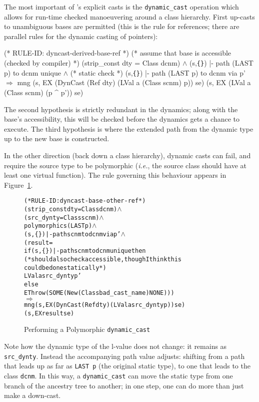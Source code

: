 \documentclass[11pt]{article}
\newcommand{\ie}{\emph{i.e.}}
\newcommand{\lbr}{\texttt{\{}}
\newcommand{\rbr}{\texttt{\}}}
\begin{document}
The most important of \cpp{}'s explicit casts is the
\texttt{dynamic_cast} operation which allows for run-time checked
manoeuvering around a class hierarchy.  First up-casts to unambiguous bases
are permitted (this is the rule for references; there are parallel
rules for the dynamic casting of pointers):%
%
%
\begin{stdrule}
(* RULE-ID: dyncast-derived-base-ref *)
(* assume that base is accessible (checked by compiler) *)
     (strip_const dty = Class dcnm) \(\land\)
     (s,\lbr\rbr) |- path (LAST p) to dcnm unique \(\land\) (* static check *)
     (s,\lbr\rbr) |- path (LAST p) to dcnm via p'
   \(\Rightarrow\)
     mng (s, EX (DynCast (Ref dty) (LVal a (Class scnm) p)) se)
         (s, EX (LVal a (Class scnm) (p ^ p')) se)
\end{stdrule}
The second hypothesis is strictly redundant in the dynamics; along with
the base's accessibility, this will be checked before the dynamics
gets a chance to execute.  The third hypothesis is where the extended
path from the dynamic type up to the new base is constructed.

In the other direction (back down a class hierarchy), dynamic casts
can fail, and require the source type to be polymorphic (\ie, the
source class should have at least one virtual function).  The rule
governing this behaviour appears in
Figure~\ref{fig:dyncast-base-other-ref}.
\begin{figure}[htbp]
\begin{center}
\begin{minipage}{\textwidth}
%
\begin{alltt}
(* RULE-ID: dyncast-base-other-ref *)
     (strip_const dty = Class dcnm) \(\land\)
     (src_dynty = Class scnm) \(\land\)
     polymorphic s (LAST p) \(\land\)
     (s,\lbr\rbr) |- path scnm to dcnm via p' \(\land\)
     (result =
      if (s,\lbr\rbr) |- path scnm to dcnm unique then
        (* should also check accessible, though I think this
           could be done statically *)
        LVal a src_dynty p'
      else
        EThrow (SOME (New (Class bad_cast_name) NONE)))
   \(\Rightarrow\)
     mng (s, EX (DynCast (Ref dty) (LVal a src_dynty p)) se)
         (s, EX result se)
\end{alltt}
\end{minipage}
\end{center}
\caption{Performing a Polymorphic \texttt{dynamic_cast}}
\label{fig:dyncast-base-other-ref}
\end{figure}
Note how the dynamic type of the l-value does not change: it remains
as \texttt{src_dynty}.  Instead the accompanying path value adjusts:
shifting from a path that leads up as far as \texttt{LAST~p} (the
original static type), to one that leads to the class \texttt{dcnm}.
In this way, a \texttt{dynamic_cast} can move the static type from one
branch of the ancestry tree to another; in one step, one can do more
than just make a down-cast.
\end{document}

